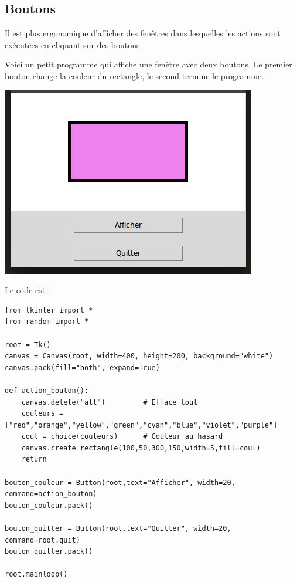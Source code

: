 \documentclass[11pt,class=report,crop=false]{standalone}
\begin{document}
\subsection{Boutons}

Il est plus ergonomique d'afficher des fenêtres dans lesquelles les actions sont exécutées en cliquant sur des boutons.

Voici un petit programme qui affiche une fenêtre avec deux boutons. Le premier bouton change la couleur du rectangle, le second termine le programme.
\begin{center}
\includegraphics[scale=0.6]{../statistique/ecran-stat-cours-boutons}
\end{center}
Le code est :
\begin{lstlisting}
from tkinter import *
from random import *

root = Tk()     
canvas = Canvas(root, width=400, height=200, background="white")
canvas.pack(fill="both", expand=True)

def action_bouton():
    canvas.delete("all")         # Efface tout
    couleurs = ["red","orange","yellow","green","cyan","blue","violet","purple"]
    coul = choice(couleurs)      # Couleur au hasard
    canvas.create_rectangle(100,50,300,150,width=5,fill=coul)
    return

bouton_couleur = Button(root,text="Afficher", width=20, command=action_bouton)
bouton_couleur.pack()

bouton_quitter = Button(root,text="Quitter", width=20, command=root.quit)
bouton_quitter.pack()

root.mainloop()
\end{lstlisting}
\end{document}
